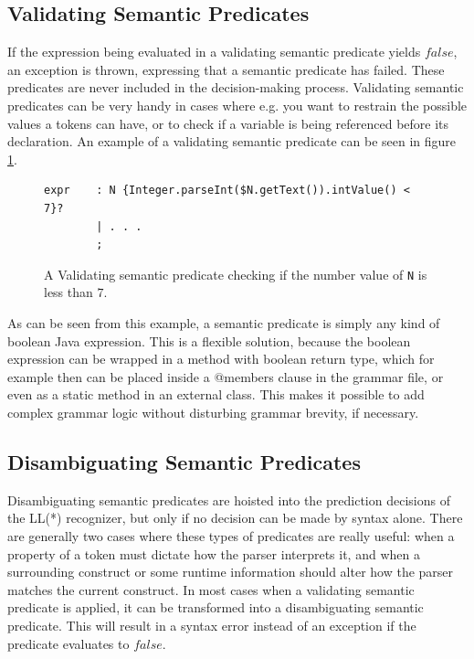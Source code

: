 \subsection{Validating Semantic Predicates}
\label{sect:antlr:val_semantic_preds}
If the expression being evaluated in a validating semantic predicate yields $false$, an exception is thrown, expressing that a semantic predicate has failed. These predicates are never included in the decision-making process. Validating semantic predicates can be very handy in cases where e.g. you want to restrain the possible values a tokens can have, or to check if a variable is being referenced before its declaration. An example of a validating semantic predicate can be seen in figure \ref{code:validateSemantic}.

\begin{figure}[h!]
\begin{verbatim}
expr    : N {Integer.parseInt($N.getText()).intValue() < 7}?
        | . . .
        ;
\end{verbatim}
\caption[Validating semantic predicate.]{A Validating semantic predicate checking if the number value of \texttt{N} is less than $7$.}
\label{code:validateSemantic}
\end{figure}
As can be seen from this example, a semantic predicate is simply any kind of boolean Java expression. This is a flexible solution, because the boolean expression can be wrapped in a method with boolean return type, which for example then can be placed inside a @members { } clause in the grammar file, or even as a static method in an external class. This makes it possible to add complex grammar logic without
disturbing grammar brevity, if necessary.

\subsection{Disambiguating Semantic Predicates}
Disambiguating semantic predicates are hoisted into the prediction decisions of the LL(*) recognizer, but only if no decision can be made by syntax alone. There are generally two cases where these types of predicates are really useful: when a property of a token must dictate how the parser interprets it, and when a surrounding construct or some runtime information should alter how the parser matches the current construct. In most cases when a validating semantic predicate is applied, it can be transformed into a disambiguating semantic predicate. This will result in a syntax error instead of an exception if the predicate evaluates to $false$.

